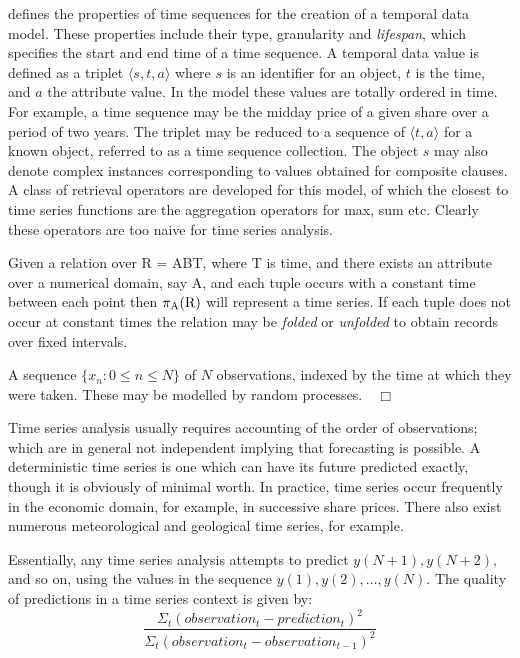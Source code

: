 \medskip
\cite{ss93} defines the properties of time sequences for the creation
of a temporal data model. These properties include their type,
granularity and {\em lifespan}, which specifies the start and end time of a
time sequence. A temporal data value is defined as a
triplet $\langle s, t, a \rangle$ where $s$ is an identifier for an
object, $t$ is the time, and $a$ the attribute value. In the model
these values are totally ordered in time. For example, a time sequence
may be the midday price of a given share over a period of two
years. The triplet may be reduced to a sequence of $\langle t, a
\rangle$ for a known object, referred to as a time sequence
collection. The object $s$ may also denote complex instances
corresponding to values obtained for composite clauses. A class of
retrieval operators are developed for this model, of which the closest
to time series functions are the aggregation operators for max, sum
etc. Clearly these operators are too naive for time series analysis.

\smallskip
Given a relation over R = ABT, where T is time, and there exists an
attribute over a numerical domain, say A, and each tuple occurs with a
constant time between each point then $\pi_{\rm A}({\rm R})$ will
represent a time 
series. If each tuple does not occur at constant times the relation
may be {\em folded} or {\em unfolded} to obtain records over fixed intervals.

\begin{definition}
\begin{rm}
A sequence $\{ x_n : 0 \le n \le N \}$ of $N$ observations, indexed by
the time at which they 
were taken. These may be modelled by random processes.$\quad\Box$
\end{rm}
\end{definition}

Time series analysis usually requires accounting of the order of
observations; which are in general not independent implying that
forecasting is possible.  A deterministic time series is one which can
have its future predicted exactly, though it is obviously of minimal
worth.  In practice, time series occur frequently in the economic
domain, for example, in successive share prices. There also exist
numerous meteorological and geological time series, for example.

Essentially, any time series analysis attempts to predict $y(N + 1),
y(N + 2),$ and  
so on, using the values in the sequence $y(1), y(2), \ldots, y(N)$.   
The quality of predictions in a time series context is given by:
\begin{displaymath}
\frac{\Sigma_t (observation_t - prediction_t)^2}
{\Sigma_t (observation_t - observation_{t-1})^2}
\end{displaymath}

